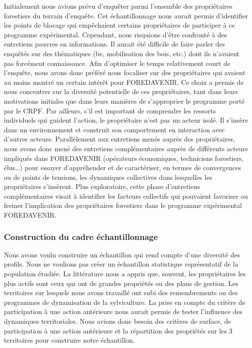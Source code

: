 \documentclass[12pt]{report}
\begin{document}
Initialement nous avions prévu d'enquêter parmi l'ensemble des propriétaires
forestiers du terrain d'enquête. Cet échantillonnage nous aurait permis
d'identifier les points de blocage qui empêchaient certains propriétaires de
participer à ce programme expérimental. Cependant, nous risquions d'être
confronté à des entretiens pauvres en informations. Il aurait été difficile de
faire parler des enquêtés sur des thématiques (\gls{be}, mobilisation des
bois, etc.) dont ils n'avaient pas forcément connaissance. Afin d’optimiser le temps
relativement court de l’enquête, nous avons donc préféré nous focaliser sur des
propriétaires qui avaient au moins montré un certain intérêt pour FOREDAVENIR.
Ce choix a permis de nous concentrer sur la diversité potentielle de
ces propriétaires, tant dans leurs motivations initiales que dans leurs manières
de s’approprier le programme porté par le CRPF. Par ailleurs, s’il est important
de comprendre les ressorts individuels qui guident l’action, le propriétaire
n’est pas un acteur isolé. Il s’insère dans un environnement et construit son
comportement en interaction avec d’autres acteurs. Parallèlement aux entretiens
menés auprès des propriétaires, nous avons donc mené des entretiens
complémentaires auprès de différents acteurs impliqués dans FOREDAVENIR
(opérateurs économiques, techniciens forestiers, élus\ldots{}) pour essayer
d’appréhender et de caractériser, en termes de convergences ou de points de
tensions, les dynamiques collectives dans lesquelles les propriétaires s’insèrent.
Plus exploratoire, cette phase d’entretiens complémentaires visait à identifier
les facteurs collectifs qui pouvaient favoriser ou freiner l’implication des
propriétaires forestiers dans le programme expérimental FOREDAVENIR.

\subsubsection{Construction du cadre échantillonnage}

Nous avons voulu construire un échantillon qui rend compte d'une diversité des
profils. Nous ne voulions pas créer un échantillon statistique représentatif de
la population étudiée. La littérature nous a appris que, souvent, les
propriétaires les plus actifs sont ceux  qui ont de grandes propriétés ou des
plans de gestion. Les territoires sur lesquels nous avons travaillé ont
subi des remembrements ou des programmes de dynamisation de la sylviculture. La
prise en compte du critère de participation à une action antérieure nous aurait
permis de tester l'influence des dynamiques territoriales. Nous avions donc
besoin des critères de surface, de participation à une action antérieure et la
répartition des propriétés sur les 3 territoires pour construire notre
échantillon.
\end{document}

